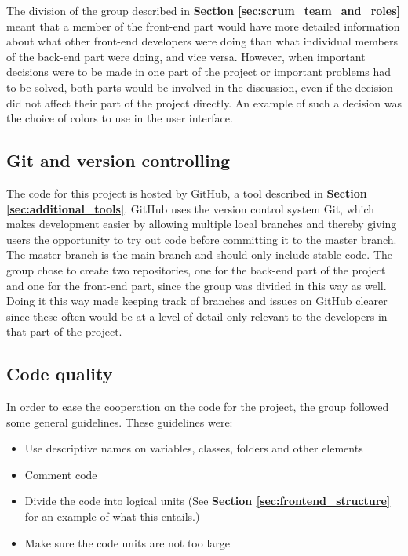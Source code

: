 The division of the group described in \textbf{Section \ref{sec:scrum_team_and_roles}} meant that a member of the front-end part would have more detailed information about what other front-end developers were doing than what individual members of the back-end part were doing, and vice versa. However, when important decisions were to be made in one part of the project or important problems had to be solved, both parts would be involved in the discussion, even if the decision did not affect their part of the project directly. An example of such a decision was the choice of colors to use in the user interface.

\subsection{Git and version controlling}

The code for this project is hosted by GitHub, a tool described in \textbf{Section \ref{sec:additional_tools}}. GitHub uses the version control system Git, which makes development easier by allowing multiple local branches and thereby giving users the opportunity to try out code before committing it to the master branch. The master branch is the main branch and should only include stable code. The group chose to create two repositories, one for the back-end part of the project and one for the front-end part, since the group was divided in this way as well. Doing it this way made keeping track of branches and issues on GitHub clearer since these often would be at a level of detail only relevant to the developers in that part of the project. 

\subsection{Code quality}

In order to ease the cooperation on the code for the project, the group followed some general guidelines. These guidelines were:
\begin{itemize}
	\item Use descriptive names on variables, classes, folders and other elements
	\item Comment code
	\item Divide the code into logical units (See \textbf{Section \ref{sec:frontend_structure}} for an example of what this entails.)
	\item Make sure the code units are not too large
\end{itemize}

